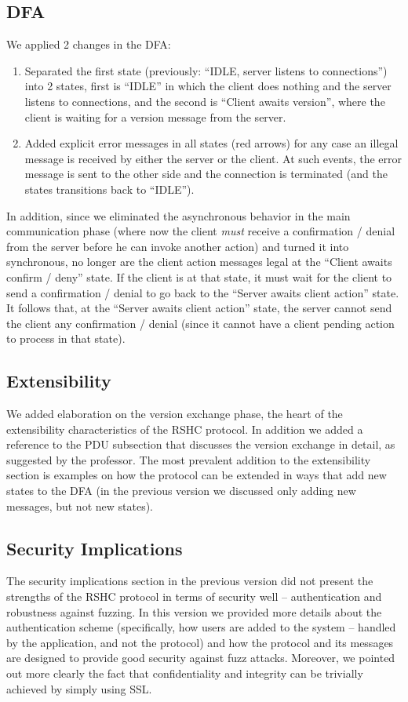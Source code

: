 \subsection{DFA}
We applied 2 changes in the DFA:
\begin{enumerate}
\item Separated the first state (previously: ``IDLE, server listens to connections'') into 2 states, first is ``IDLE'' in which the client does nothing and the server listens to connections, and the second is ``Client awaits version'', where the client is waiting for a version message from the server.
\item Added explicit error messages in all states (red arrows) for any case an illegal message is received by either the server or the client. At such events, the error message is sent to the other side and the connection is terminated (and the states transitions back to ``IDLE'').
\end{enumerate}

In addition, since we eliminated the asynchronous behavior in the main communication phase (where now the client {\em must} receive a confirmation / denial from the server before he can invoke another action) and turned it into synchronous, no longer are the client action messages legal at the ``Client awaits confirm / deny'' state. If the client is at that state, it must wait for the client to send a confirmation / denial to go back to the ``Server awaits client action'' state. It follows that, at the ``Server awaits client action'' state, the server cannot send the client any confirmation / denial (since it cannot have a client pending action to process in that state).

\subsection{Extensibility}
We added elaboration on the version exchange phase, the heart of the extensibility characteristics of the RSHC protocol. In addition we added a reference to the PDU subsection that discusses the version exchange in detail, as suggested by the professor. The most prevalent addition to the extensibility section is examples on how the protocol can be extended in ways that add new states to the DFA (in the previous version we discussed only adding new messages, but not new states).

\subsection{Security Implications}
The security implications section in the previous version did not present the strengths of the RSHC protocol in terms of security well -- authentication and robustness against fuzzing. In this version we provided more details about the authentication scheme (specifically, how users are added to the system -- handled by the application, and not the protocol) and how the protocol and its messages are designed to provide good security against fuzz attacks. Moreover, we pointed out more clearly the fact that confidentiality and integrity can be trivially achieved by simply using SSL.
